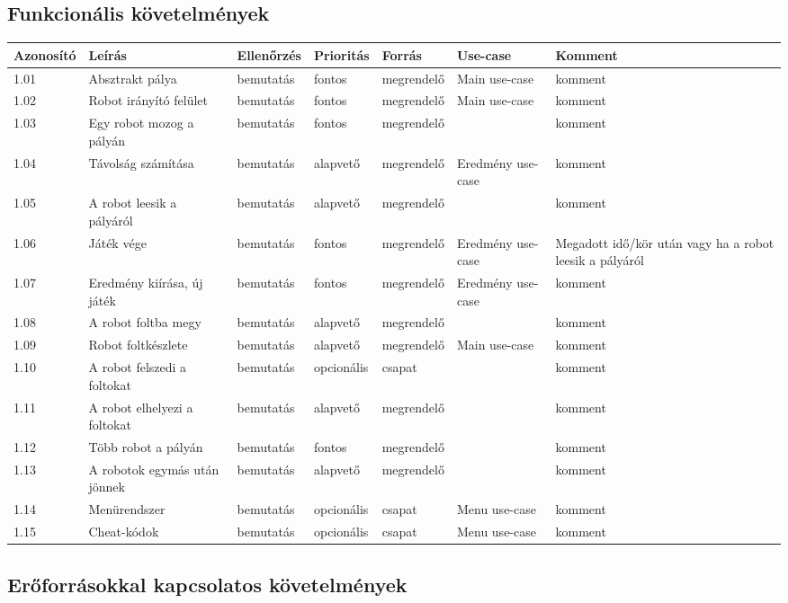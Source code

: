 \subsection{Funkcionális követelmények}


\begin{longtable}{| l | l | l | l | l | l | l |}
\hline
\textbf{Azonosító}   & \textbf{Leírás} & \textbf{Ellenőrzés} & \textbf{Prioritás} & \textbf{Forrás} & \textbf{Use-case} & \textbf{Komment} \tabularnewline
\hline\hline
1.01 & Absztrakt pálya & bemutatás & fontos & megrendelő & Main use-case & komment \tabularnewline
\hline
1.02 & Robot irányító felület & bemutatás & fontos & megrendelő & Main use-case & komment \tabularnewline
\hline
1.03 & Egy robot mozog a pályán & bemutatás & fontos & megrendelő &  & komment \tabularnewline
\hline
1.04 & Távolság számítása & bemutatás & alapvető & megrendelő & Eredmény use-case & komment \tabularnewline
\hline
1.05 & A robot leesik a pályáról & bemutatás & alapvető & megrendelő &  & komment \tabularnewline
\hline
1.06 & Játék vége & bemutatás & fontos & megrendelő & Eredmény use-case & Megadott idő/kör után vagy ha a robot leesik a pályáról \tabularnewline
\hline
1.07 & Eredmény kiírása, új játék & bemutatás & fontos & megrendelő & Eredmény use-case & komment \tabularnewline
\hline
1.08 & A robot foltba megy& bemutatás & alapvető & megrendelő &  & komment \tabularnewline
\hline
1.09 & Robot foltkészlete & bemutatás & alapvető & megrendelő & Main use-case & komment \tabularnewline
\hline
1.10 & A robot felszedi a foltokat & bemutatás & opcionális & csapat &  & komment \tabularnewline
\hline
1.11 & A robot elhelyezi a foltokat & bemutatás & alapvető & megrendelő &  & komment \tabularnewline
\hline
1.12 & Több robot a pályán & bemutatás & fontos & megrendelő &  & komment \tabularnewline
\hline
1.13 & A robotok egymás után jönnek & bemutatás & alapvető & megrendelő &  & komment \tabularnewline
\hline
1.14 & Menürendszer & bemutatás & opcionális & csapat & Menu use-case & komment \tabularnewline
\hline
1.15 & Cheat-kódok & bemutatás & opcionális & csapat & Menu use-case & komment \tabularnewline
\hline
\end{longtable}

\subsection{Erőforrásokkal kapcsolatos követelmények}

